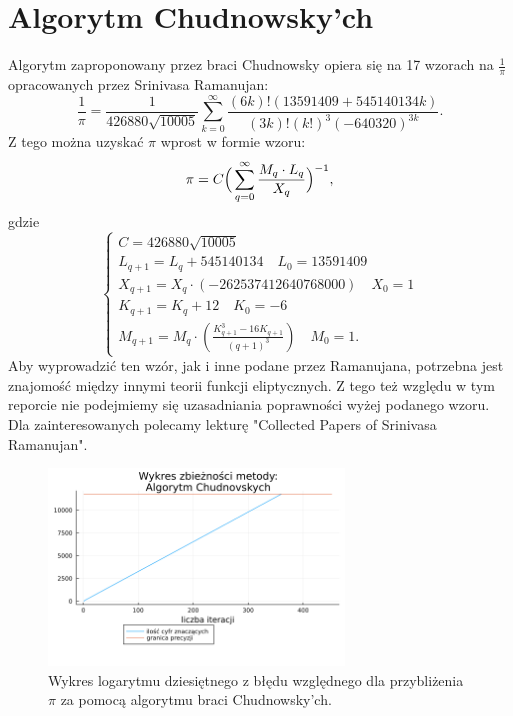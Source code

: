\section{Algorytm Chudnowsky'ch}

Algorytm zaproponowany przez braci Chudnowsky opiera się na 17 wzorach na $\frac1\pi$ opracowanych przez Srinivasa Ramanujan\cite{review}:
$${\frac {1}{\pi }}={\frac {1}{426880{\sqrt {10005}}}}\sum _{k=0}^{\infty }{\frac {(6k)!(13591409+545140134k)}{(3k)!(k!)^{3}(-640320)^{3k}}}.$$
Z tego można uzyskać $\pi$ wprost w formie wzoru:
$$\pi=C\Big(\sum\limits_{q=0}^\infty{M_q\cdot L_q\over X_q}\Big)^{-1},$$
gdzie 
$$
\begin{cases}
    C=426880\sqrt{10005}\\
    L_{q+1}=L_q+545140134 \quad L_0=13591409  \\
    X_{q+1}=X_q\cdot(-262537412640768000)\quad X_0=1\\
    K_{q+1}=K_q+12\quad K_0=-6\\
    M_{q+1}=M_{q}\cdot \left({\frac {K_{q+1}^{3}-16K_{q+1}}{\left(q+1\right)^{3}}}\right)\quad M_{0}=1.
\end{cases}
$$
Aby wyprowadzić ten wzór, jak i inne podane przez Ramanujana, potrzebna jest znajomość między innymi teorii funkcji eliptycznych\cite{review}. Z tego też względu w tym reporcie nie podejmiemy się uzasadniania poprawności wyżej podanego wzoru. Dla zainteresowanych polecamy lekturę "Collected Papers of Srinivasa Ramanujan"\cite{ramanujan}.

\begin{figure}[!h]
    \centering
    \renewcommand{\figurename}{Wykres}
    \includegraphics[width=0.7\textwidth]{../prog/chudnowsky_log_error.png}
    \caption{Wykres logarytmu dziesiętnego z błędu względnego dla przybliżenia $\pi$ za pomocą algorytmu braci Chudnowsky'ch.}
    \label{chudnowsky-error}
\end{figure}

